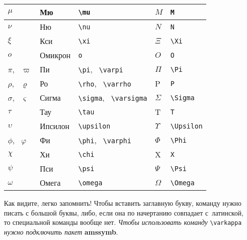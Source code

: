 \documentclass{article}
\begin{document}
\begin{center}
\begin{tabular}{|l|l|l||l|l|}
$\mu$                       & Мю     & \verb"\mu"                            & $M$       & \verb"M"       \\ \hline
$\nu$                       & Ню     & \verb"\nu"                            & $N$       & \verb"N"       \\ \hline
$\xi$                       & Кси    & \verb"\xi"                            & $\Xi$     & \verb"\Xi"     \\ \hline
$o$                         & Омикрон& \verb"o"                              & $O$       & \verb"O"       \\ \hline
$\pi$, \, $\varpi$          & Пи     & \verb"\pi", \, \verb"\varpi"          & $\Pi$     & \verb"\Pi"     \\ \hline
$\rho$, \, $\varrho$        & Ро     & \verb"\rho", \, \verb"\varrho"        & P         & \verb"P"       \\ \hline
$\sigma$, \, $\varsigma$    & Сигма  & \verb"\sigma", \, \verb"\varsigma"    & $\Sigma$  & \verb"\Sigma"  \\ \hline
$\tau$                      & Тау    & \verb"\tau"                           & T         & \verb"T"       \\ \hline
$\upsilon$                  & Ипсилон& \verb"\upsilon"                       & $\Upsilon$& \verb"\Upsilon"\\ \hline
$\phi$, \, $\varphi$        & Фи     & \verb"\phi", \, \verb"\varphi"        & $\Phi$    & \verb"\Phi"    \\ \hline
$\chi$                      & Хи     & \verb"\chi"                           & X         & \verb"X"       \\ \hline
$\psi$                      & Пси    & \verb"\psi"                           & $\Psi$    & \verb"\Psi"    \\ \hline
$\omega$                    & Омега  & \verb"\omega"                         & $\Omega$  & \verb"\Omega"  \\ \hline
\end{tabular}
\end{center}

\medskip

Как видите, легко запомнить!
Чтобы вставить заглавную букву, команду нужно писать с большой буквы, либо, если она по начертанию совпадает с~латинской, то специальной команды вообще нет. \textit{Чтобы использовать команду} \verb"\varkappa" \textit{нужно подключить пакет} \textbf{amssymb}.
\end{document}
